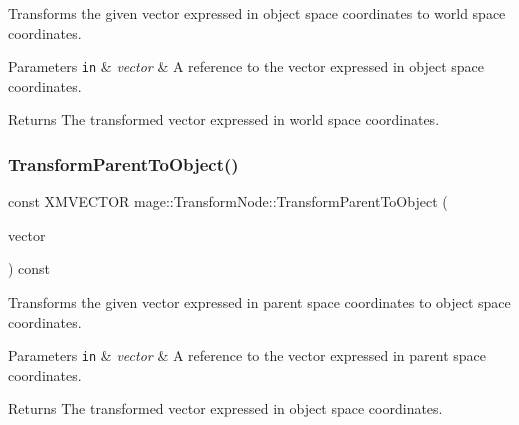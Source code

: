 Transforms the given vector expressed in object space coordinates to world space coordinates.


\begin{DoxyParams}[1]{Parameters}
\mbox{\tt in}  & {\em vector} & A reference to the vector expressed in object space coordinates. \\
\hline
\end{DoxyParams}
\begin{DoxyReturn}{Returns}
The transformed vector expressed in world space coordinates. 
\end{DoxyReturn}
\hypertarget{classmage_1_1_transform_node_adba5732ccaf2edcbd293ba509eb2ec35}{}\label{classmage_1_1_transform_node_adba5732ccaf2edcbd293ba509eb2ec35} 
\subsubsection{\texorpdfstring{Transform\+Parent\+To\+Object()}{TransformParentToObject()}}
{\footnotesize\ttfamily const X\+M\+V\+E\+C\+T\+OR mage\+::\+Transform\+Node\+::\+Transform\+Parent\+To\+Object (\begin{DoxyParamCaption}\item[{const X\+M\+V\+E\+C\+T\+OR \&}]{vector }\end{DoxyParamCaption}) const}

Transforms the given vector expressed in parent space coordinates to object space coordinates.


\begin{DoxyParams}[1]{Parameters}
\mbox{\tt in}  & {\em vector} & A reference to the vector expressed in parent space coordinates. \\
\hline
\end{DoxyParams}
\begin{DoxyReturn}{Returns}
The transformed vector expressed in object space coordinates. 
\end{DoxyReturn}
\hypertarget{classmage_1_1_transform_node_af35f0b8ed64dd065b03356a029497285}{}\label{classmage_1_1_transform_node_af35f0b8ed64dd065b03356a029497285} 
